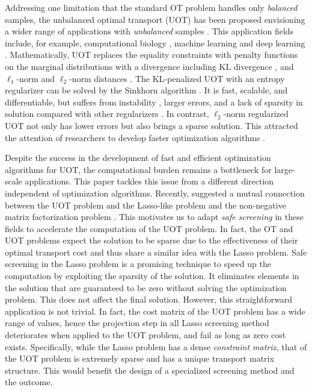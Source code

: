 \documentclass[twoside]{article}
\theoremstyle{plain}
\begin{document}
Addressing one limitation that the standard OT problem handles only {\it balanced} samples, the unbalanced optimal transport (UOT) has been proposed envisioning a wider range of applications with {\it unbalanced} samples \citep{Caffarelli_AM_2010,chizat2017scaling}. This application fields include, for example, computational biology \citep{Schiebinger_CELL_2019}, machine learning \citep{Janati_AISTATS_2019} and deep learning \citep{Yang_ICLR_2019}. Mathematically, UOT replaces the equality constraints with penalty functions on the marginal distributions with a divergence including KL divergence \citep{Liero:2018wo}, and $\ell_1$-norm \citep{Caffarelli_AM_2010} and $\ell_2$-norm distances \citep{refId0}. The KL-penalized UOT with an entropy regularizer can be solved by the Sinkhorn algorithm \citep{UOTSinkhorn2020}. It is fast, scalable, and differentiable, but suffers from instability \citep{DBLP:journals/corr/Schmitzer16}, larger errors, and a lack of sparsity in solution compared with other regularizers \citep{Blondel_AISTATS_2018}. In contrast, $\ell_2$-norm regularized UOT not only has lower errors but also brings a sparse solution. This attracted the attention of researchers to develop faster optimization algorithms \citep{Blondel_AISTATS_2018, Nguyen_arXiv_2022}.

Despite the success in the development of fast and efficient optimization algorithms for UOT, the computational burden remains a bottleneck for large-scale applications. This paper tackles this issue from a different direction independent of optimization algorithms. Recently, \cite{Chapel_NeurIPS_2021} suggested a mutual connection between the UOT problem and the Lasso-like problem \citep{Tibshirani_JRSS_1996,Efron_AM_2004} and the non-negative matrix factorization problem \citep{Lee_NIPS_2000}. This motivates us to adapt {\it safe screening} \citep{ghaoui2010safe} in these fields to accelerate the computation of the UOT problem. In fact, the OT and UOT problems expect the solution to be sparse due to the effectiveness of their optimal transport cost and thus share a similar idea with the Lasso problem.
Safe screening in the Lasso problem is a promising technique to speed up the computation by exploiting the sparsity of the solution. It eliminates elements in the solution that are guaranteed to be zero without solving the optimization problem. This does not affect the final solution. However, this straightforward application is not trivial. In fact, the cost matrix of the UOT problem has a wide range of values, hence the projection step in all Lasso screening method deteriorates when applied to the UOT problem, and fail as long as zero cost exists.
Specifically, while the Lasso problem has a dense {\it constraint matrix}, that of the UOT problem is extremely sparse and has a unique transport matrix structure. This would benefit the design of a specialized screening method and the outcome.
%
\end{document}
